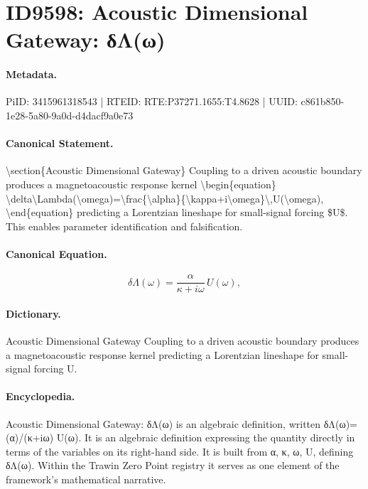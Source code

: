\section*{ID9598: Acoustic Dimensional Gateway: δΛ(ω)}
\paragraph{Metadata.}
PiID: 3415961318543 | RTEID: RTE:P37271.1655:T4.8628 | UUID: c861b850-1e28-5a80-9a0d-d4dacf9a0e73

\paragraph{Canonical Statement.}
\textbackslash{}section\{Acoustic Dimensional Gateway\} Coupling to a driven acoustic boundary produces a magnetoacoustic response kernel \textbackslash{}begin\{equation\} \textbackslash{}delta\textbackslash{}Lambda(\textbackslash{}omega)=\textbackslash{}frac\{\textbackslash{}alpha\}\{\textbackslash{}kappa+i\textbackslash{}omega\}\textbackslash{},U(\textbackslash{}omega), \textbackslash{}end\{equation\} predicting a Lorentzian lineshape for small-signal forcing \$U\$. This enables parameter identification and falsification.

\paragraph{Canonical Equation.}
\[
\delta\Lambda(\omega)=\frac{\alpha}{\kappa+i\omega}\,U(\omega),
\]

\paragraph{Dictionary.}
Acoustic Dimensional Gateway Coupling to a driven acoustic boundary produces a magnetoacoustic response kernel predicting a Lorentzian lineshape for small-signal forcing U.

\paragraph{Encyclopedia.}
Acoustic Dimensional Gateway: δΛ(ω) is an algebraic definition, written δΛ(ω)=(α)/(κ+iω) U(ω). It is an algebraic definition expressing the quantity directly in terms of the variables on its right-hand side. It is built from α, κ, ω, U, defining δΛ(ω). Within the Trawin Zero Point registry it serves as one element of the framework's mathematical narrative.
